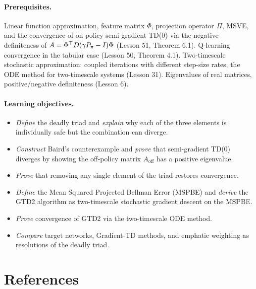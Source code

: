 \documentclass[11pt,a4paper]{article}
\begin{document}
\paragraph{Prerequisites.}
Linear function approximation, feature matrix $\Phi$, projection
operator $\Pi$, MSVE, and the convergence of on-policy semi-gradient
TD(0) via the negative definiteness of
$A = \Phi^\top D(\gamma P_\pi - I)\Phi$ (Lesson 51, Theorem 6.1).
Q-learning convergence in the tabular case (Lesson 50, Theorem 4.1).
Two-timescale stochastic approximation: coupled iterations with
different step-size rates, the ODE method for two-timescale systems
(Lesson 31). Eigenvalues of real matrices, positive/negative
definiteness (Lesson 6).

\paragraph{Learning objectives.}
\begin{itemize}
  \item \emph{Define} the deadly triad and \emph{explain} why each of
    the three elements is individually safe but the combination can
    diverge.
  \item \emph{Construct} Baird's counterexample and \emph{prove} that
    semi-gradient TD(0) diverges by showing the off-policy matrix
    $A_{\mathrm{off}}$ has a positive eigenvalue.
  \item \emph{Prove} that removing any single element of the triad
    restores convergence.
  \item \emph{Define} the Mean Squared Projected Bellman Error (MSPBE)
    and \emph{derive} the GTD2 algorithm as two-timescale stochastic
    gradient descent on the MSPBE.
  \item \emph{Prove} convergence of GTD2 via the two-timescale ODE
    method.
  \item \emph{Compare} target networks, Gradient-TD methods, and
    emphatic weighting as resolutions of the deadly triad.
\end{itemize}

\section{References}
\label{sec:references}
\end{document}
